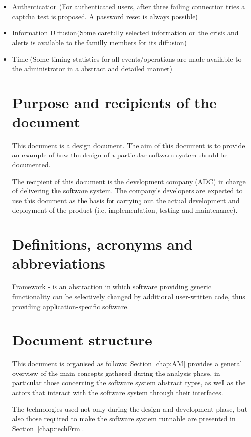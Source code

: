 \begin{itemize}
  \item Authentication (For authenticated users, after three failing
  connection tries a captcha test is proposed. A password reset is always
  possible)
  \item Information Diffusion(Some carefully selected information on
the crisis and alerts is available to the familly members for its diffusion)
  \item Time (Some timing statistics for all events/operations
are made available to the administrator in a abstract and detailed manner)
  
  




\section{Purpose and recipients of the document}
This document is a design document. The aim of this document is to provide an
example of how the design of a particular software system should be documented. 

The recipient of this document is the development company (ADC) in charge
of delivering the software system. The company's developers are
expected to use this document as the basis for carrying out the actual
development and deployment of the product (i.e. implementation, testing
and maintenance).





\section{Definitions, acronyms and abbreviations}
Framework - is an abstraction in which software providing generic functionality
can be selectively changed by additional user-written code, thus providing application-specific software.


  
\section{Document structure} 
This document is organised as follows: Section \ref{chap:AM} provides a general
overview of the main concepts gathered during the analysis phase, in particular those concerning the software system abstract
types, as well as the actors that interact with the
software system through their interfaces. 

The technologies used not only during the design and development phase, but 
also those required to make the software system runnable are presented in
Section~\ref{chap:techFrm}.


\end{itemize}
